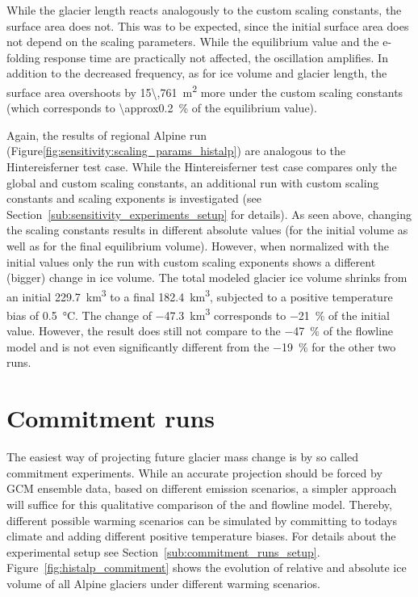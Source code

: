       While the glacier length reacts analogously to the custom scaling constants, the surface area does not. This was to be expected, since the initial surface area does not depend on the scaling parameters. While the equilibrium value and the e-folding response time are practically not affected, the oscillation amplifies. In addition to the decreased frequency, as for ice volume and glacier length, the surface area overshoots by \SI{15\,761}{\square\meter} more under the custom scaling constants (which corresponds to \SI{\approx0.2}{\percent} of the equilibrium value).
      
      Again, the results of regional Alpine run (Figure\ref{fig:sensitivity:scaling_params_histalp}) are analogous to the Hintereisferner test case. While the Hintereisferner test case compares only the global and custom scaling constants, an additional run with custom scaling constants and scaling exponents is investigated (see Section~\ref{sub:sensitivity_experiments_setup} for details). As seen above, changing the scaling constants results in different absolute values (for the initial volume as well as for the final equilibrium volume). However, when normalized with the initial values only the run with custom scaling exponents shows a different (bigger) change in ice volume. The total modeled glacier ice volume shrinks from an initial \SI{229.7}{\cubic\kilo\meter} to a final \SI{182.4}{\cubic\kilo\meter}, subjected to a positive temperature bias of \SI{+0.5}{\celsius}. The change of \SI{-47.3}{\cubic\kilo\meter} corresponds to \SI{-21}{\percent} of the initial value. However, the result does still not compare to the \SI{-47}{\percent} of the flowline model and is not even significantly different from the \SI{-19}{\percent} for the other two \vas{} runs.




  \section{Commitment runs} %
  \label{sec:commitment_runs_results}

    The easiest way of projecting future glacier mass change is by so called commitment experiments. While an accurate projection should be forced by GCM ensemble data, based on different emission scenarios, a simpler approach will suffice for this qualitative comparison of the \vas{} and flowline model. Thereby, different possible warming scenarios can be simulated by committing to todays climate and adding different positive temperature biases. For details about the experimental setup see Section~\ref{sub:commitment_runs_setup}. Figure~\ref{fig:histalp_commitment} shows the evolution of relative and absolute ice volume of all Alpine glaciers under different warming scenarios.

